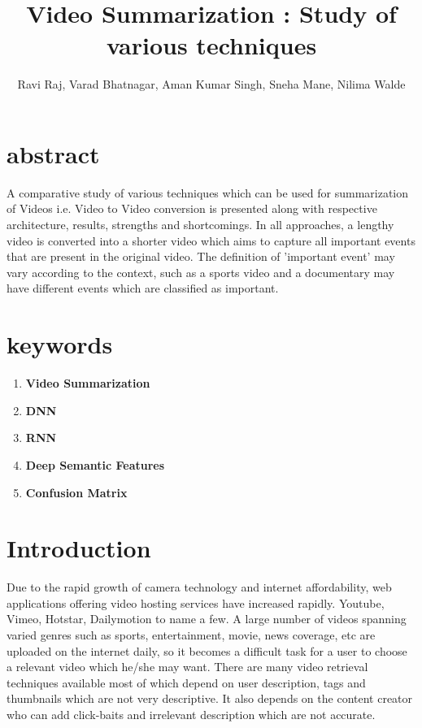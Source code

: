 \documentclass[twocolumn,showpacs,%
  nofootinbib,aps,superscriptaddress,%
  eqsecnum,prd,notitlepage,showkeys,10pt]{revtex4-1}
\begin{document}
\title{Video Summarization : Study of various techniques 
}
\author{Ravi Raj, Varad Bhatnagar, Aman Kumar Singh, Sneha Mane, Nilima Walde
}

\maketitle

\section{abstract}
A comparative study of various techniques which can be used for summarization of Videos i.e. Video to Video conversion is presented along with respective architecture, results, strengths and shortcomings. In all approaches, a lengthy video is converted into a shorter video which aims to capture all important events that are present in the original video. The definition of 'important event' may vary according to the context, such as a sports video and a documentary may have different events which are classified as important.
\section{keywords}
\begin{enumerate}
  \item \textbf{Video Summarization} 
  \item \textbf{DNN} 
  \item \textbf{RNN}
  \item \textbf{Deep Semantic Features}
  \item \textbf{Confusion Matrix} 
\end{enumerate}

\section{Introduction}

Due to the rapid growth of camera technology and internet affordability, web applications offering video hosting services have increased rapidly. Youtube, Vimeo, Hotstar, Dailymotion to name a few. A large number of videos spanning varied genres such as sports, entertainment, movie, news coverage, etc are uploaded on the internet daily, so it becomes a difficult task for a user to choose a relevant video which he/she may want. There are many video retrieval techniques available most of which depend on user description, tags and thumbnails which are not very descriptive. It also depends on the content creator who can add click-baits and irrelevant description which are not accurate. 
\end{document}
